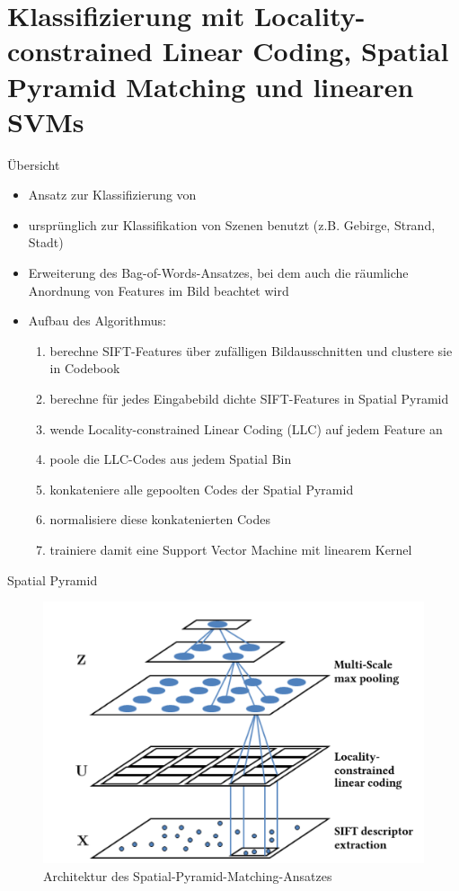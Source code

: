 \section{Klassifizierung mit Locality-constrained Linear Coding, Spatial Pyramid Matching und linearen SVMs}
\begin{frame}[t,fragile]{Übersicht}
	\begin{itemize}
		\item Ansatz zur Klassifizierung von \citet{lsp06}
		\item ursprünglich zur Klassifikation von Szenen benutzt (z.B. Gebirge, Strand, Stadt)
		\item Erweiterung des Bag-of-Words-Ansatzes, bei dem auch die räumliche Anordnung von Features im Bild beachtet wird
		\item Aufbau des Algorithmus:
		\begin{enumerate}
			\item berechne SIFT-Features über zufälligen Bildausschnitten und clustere sie in Codebook
			\item berechne für jedes Eingabebild dichte SIFT-Features in Spatial Pyramid
			\item wende Locality-constrained Linear Coding (LLC) auf jedem Feature an
			\item poole die LLC-Codes aus jedem Spatial Bin
			\item konkateniere alle gepoolten Codes der Spatial Pyramid
			\item normalisiere diese konkatenierten Codes
			\item trainiere damit eine Support Vector Machine mit linearem Kernel
		\end{enumerate}
	\end{itemize}
\end{frame}

\begin{frame}[t, fragile]{Spatial Pyramid}
	\begin{figure}
		\centering
		\includegraphics[scale=0.25]{img/architecture}
		\caption{Architektur des Spatial-Pyramid-Matching-Ansatzes \cite{yygh09}}
	\end{figure}
\end{frame}

